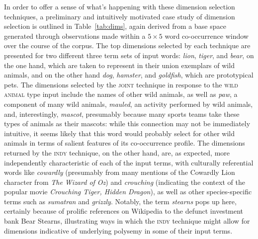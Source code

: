 In order to offer a sense of what's happening with these dimension selection techniques, a preliminary and intuitively motivated case study of dimension selection is outlined in Table~\ref{tab:dims}, again derived from a base space generated through observations made within a $5 \times 5$ word co-occurrence window over the course of the corpus.  The top dimensions selected by each technique are presented for two different three term sets of input words: \emph{lion}, \emph{tiger}, and \emph{bear}, on the one hand, which are taken to represent in their union exemplars of wild animals, and on the other hand \emph{dog}, \emph{hamster}, and \emph{goldfish}, which are prototypical pets.  The dimensions selected by the \textsc{joint} technique in response to the \textsc{wild animal} type input include the names of other wild animals, as well as \emph{paw}, a component of many wild animals, \emph{mauled}, an activity performed by wild animals, and, interestingly, \emph{mascot}, presumably because many sports teams take these types of animals as their mascots: while this connection may not be immediately intuitive, it seems likely that this word would probably select for other wild animals in terms of salient features of its co-occurrence profile.  The dimensions returned by the \textsc{indy} technique, on the other hand, are, as expected, more independently characteristic of each of the input terms, with culturally referential words like \emph{cowardly} (presumably from many mentions of the Cowardly Lion character from \emph{The Wizard of Oz}) and \emph{crouching} (indicating the context of the popular movie \emph{Crouching Tiger, Hidden Dragon}), as well as other species-specific terms such as \emph{sumatran} and \emph{grizzly}.  Notably, the term \emph{stearns} pops up here, certainly because of prolific references on Wikipedia to the defunct investment bank Bear Stearns, illustrating ways in which the \textsc{indy} technique might allow for dimensions indicative of underlying polysemy in some of their input terms.


